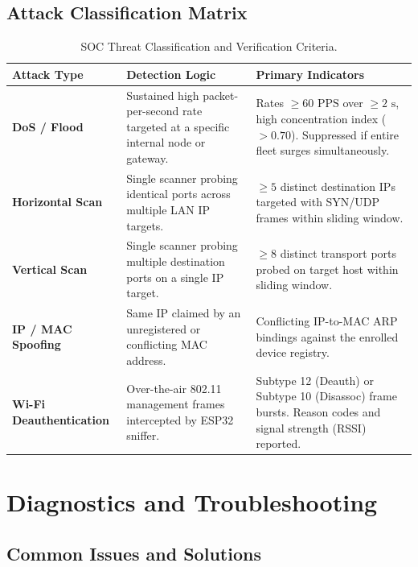 \documentclass[11pt,a4paper]{article}
\begin{document}
\subsection{Attack Classification Matrix}
\begin{table}[htbp]
\centering
\begin{tabularx}{\textwidth}{p{3.2cm}p{5.0cm}X}
\toprule
\textbf{Attack Type} & \textbf{Detection Logic} & \textbf{Primary Indicators} \\
\midrule
\textbf{DoS / Flood} & Sustained high packet-per-second rate targeted at a specific internal node or gateway. & Rates $\ge 60\text{ PPS}$ over $\ge 2\text{ s}$, high concentration index ($>0.70$). Suppressed if entire fleet surges simultaneously. \\
\addlinespace
\textbf{Horizontal Scan} & Single scanner probing identical ports across multiple LAN IP targets. & $\ge 5$ distinct destination IPs targeted with SYN/UDP frames within sliding window. \\
\addlinespace
\textbf{Vertical Scan} & Single scanner probing multiple destination ports on a single IP target. & $\ge 8$ distinct transport ports probed on target host within sliding window. \\
\addlinespace
\textbf{IP / MAC Spoofing} & Same IP claimed by an unregistered or conflicting MAC address. & Conflicting IP-to-MAC ARP bindings against the enrolled device registry. \\
\addlinespace
\textbf{Wi-Fi Deauthentication} & Over-the-air 802.11 management frames intercepted by ESP32 sniffer. & Subtype 12 (Deauth) or Subtype 10 (Disassoc) frame bursts. Reason codes and signal strength (RSSI) reported. \\
\bottomrule
\end{tabularx}
\caption{SOC Threat Classification and Verification Criteria.}
\end{table}

\section{Diagnostics and Troubleshooting}

\subsection{Common Issues and Solutions}
\end{document}
